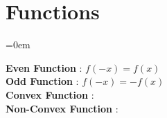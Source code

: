 
\section{Functions}
\label{sec:functions}
\parindent=0em

\textbf{Even Function} : \( f(-x) = f(x) \) \\
\textbf{Odd Function} : \( f(-x) = -f(x) \) \\
\textbf{Convex Function} :  \\
\textbf{Non-Convex Function} : \\



\sectionend
